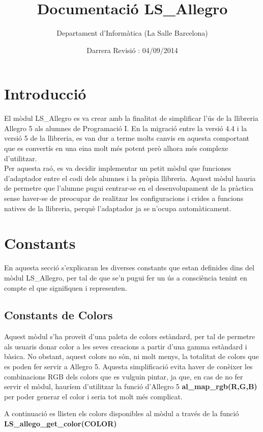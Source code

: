 \documentclass[11pt]{article}
\title{Documentació LS\_Allegro}
\author{Departament d'Informàtica (La Salle Barcelona)}
\date{Darrera Revisió : 04/09/2014}
\begin{document}
\maketitle

\tableofcontents

\pagebreak


\section{Introducció}
El mòdul LS\_Allegro es va crear amb la finalitat de simplificar l'ús de la llibreria Allegro 5 als alumnes de Programació I. En la migració entre la versió 4.4 i la versió 5 de la llibreria, es van dur a terme molts canvis en aquesta comportant que es convertís en una eina molt més potent però alhora més complexe d'utilitzar.\\
Per aquesta raó, es va decidir implementar un petit mòdul que funciones d'adaptador entre el codi dels alumnes i la pròpia llibreria. Aquest mòdul hauria de permetre que l'alumne pugui centrar-se en el desenvolupament de la pràctica sense haver-se de preocupar de realitzar les configuracions i crides a funcions natives de la llibreria, perquè l'adaptador ja se n'ocupa automàticament.


\section{Constants}
En aquesta secció s'explicaran les diverses constants que estan definides dins del mòdul LS\_Allegro, per tal de que se'n pugui fer un ús a consciència tenint en compte el que signifiquen i representen.

\subsection{Constants de Colors}
Aquest mòdul s'ha proveït d'una paleta de colors estàndard, per tal de permetre als usuaris donar color a les seves creacions a partir d'una gamma  estàndard i bàsica. No obstant, aquest colors no són, ni molt menys, la totalitat de colors que es poden fer servir a Allegro 5. Aquesta simplificació evita haver de conèixer les combinacions RGB dels colors que es vulguin pintar, ja que, en cas de no fer servir el mòdul, hauríem d'utilitzar la funció d'Allegro 5 \textbf{al\_map\_rgb(R,G,B)} per poder generar el color i seria tot molt més complicat.

\pagebreak
\noindent A continuació es llisten els colors disponibles al mòdul a través de la funció \textbf{LS\_allego\_get\_color(COLOR)}
\end{document}

